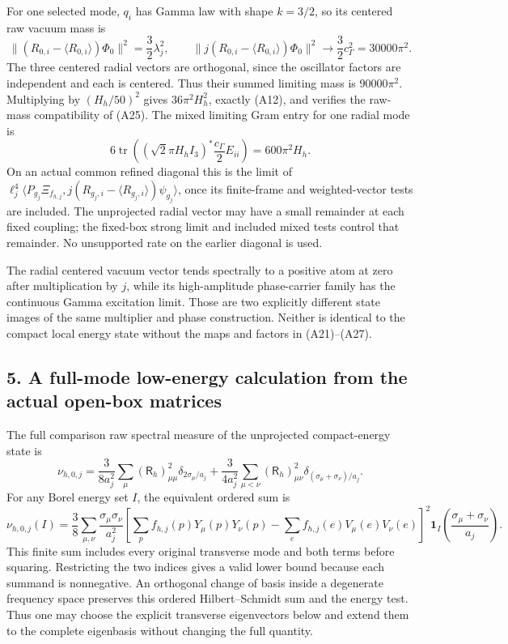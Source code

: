 \documentclass[
  11pt,
]{article}
\begin{document}
For one selected mode, \(q_i\) has Gamma law with shape \(k=3/2\), so
its centered raw vacuum mass is \[
 \|(R_{0,i}-\langle R_{0,i}\rangle)\Phi_0\|^2
   =\frac32\lambda_j^2,
 \qquad
 \|j(R_{0,i}-\langle R_{0,i}\rangle)\Phi_0\|^2
   \longrightarrow\frac32c_\Gamma^2=30000\pi^2.
\tag{A26}
\] The three centered radial vectors are orthogonal, since the
oscillator factors are independent and each is centered. Thus their
summed limiting mass is \(90000\pi^2\). Multiplying by \((H_h/50)^2\)
gives \(36\pi^2H_h^2\), exactly (A12), and verifies the raw-mass
compatibility of (A25). The mixed limiting Gram entry for one radial
mode is \[
 6\operatorname{tr}\left((\sqrt2\pi H_hI_3)^*
                                      \frac{c_\Gamma}2E_{ii}\right)
 =600\pi^2H_h.
\tag{A27}
\] On an actual common refined diagonal this is the limit of
\(\ell_j^4\langle P_{g_j}\Xi_{f_{h,j}},
 j(R_{g_j,i}-\langle R_{g_j,i}\rangle)\psi_{g_j}\rangle\), once its
finite-frame and weighted-vector tests are included. The unprojected
radial vector may have a small remainder at each fixed coupling; the
fixed-box strong limit and included mixed tests control that remainder.
No unsupported rate on the earlier diagonal is used.

The radial centered vacuum vector tends spectrally to a positive atom at
zero after multiplication by \(j\), while its high-amplitude
phase-carrier family has the continuous Gamma excitation limit. Those
are two explicitly different state images of the same multiplier and
phase construction. Neither is identical to the compact local energy
state without the maps and factors in (A21)--(A27).

\subsection{5. A full-mode low-energy calculation from the actual
open-box
matrices}\label{weak-coupling-part-10-a-full-mode-low-energy-calculation-from-the-actual-open-box-matrices}

The full comparison raw spectral measure of the unprojected
compact-energy state is \[
 \nu_{h,0,j}
 =\frac3{8a_j^2}\sum_\mu (\mathsf R_h)_{\mu\mu}^2
                         \delta_{2\sigma_\mu/a_j}
 +\frac3{4a_j^2}\sum_{\mu<\nu}(\mathsf R_h)_{\mu\nu}^2
                         \delta_{(\sigma_\mu+\sigma_\nu)/a_j}.
\tag{A28}
\] For any Borel energy set \(I\), the equivalent ordered sum is \[
 \nu_{h,0,j}(I)=\frac38\sum_{\mu,\nu}
 \frac{\sigma_\mu\sigma_\nu}{a_j^2}
 \left[
   \sum_pf_{h,j}(p)Y_\mu(p)Y_\nu(p)
  -\sum_ef_{h,j}(e)V_\mu(e)V_\nu(e)
 \right]^2
 \mathbf1_I\left(\frac{\sigma_\mu+\sigma_\nu}{a_j}\right).
\tag{A29}
\] This finite sum includes every original transverse mode and both
terms before squaring. Restricting the two indices gives a valid lower
bound because each summand is nonnegative. An orthogonal change of basis
inside a degenerate frequency space preserves this ordered
Hilbert--Schmidt sum and the energy test. Thus one may choose the
explicit transverse eigenvectors below and extend them to the complete
eigenbasis without changing the full quantity.
\end{document}
